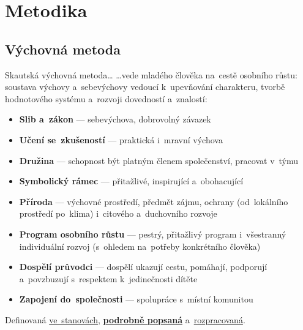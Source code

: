 \documentclass[compress, xelatex, 11pt, xcolor=dvipsnames, print, aspectratio=169,
	hyperref={
		bookmarks=true,
		unicode=true,
		colorlinks=true,
		pdftitle={Skautska vychovna metoda},
		plainpages=false,
		pdfauthor={Vojtech Zeisek},
		pdfsubject={Skautska vychovna metoda a jeji vyvoj za posledni stoleti a desetileti},
		pdfcreator={XeLaTeX},
		pdfkeywords={Junak, Pedagogika, Skaut, Skauting, Vychovna metoda},
		linkcolor=Red, %
		anchorcolor=ForestGreen, %
		citecolor=ForestGreen, %
		filecolor=ForestGreen, %
		menucolor=ForestGreen, %
		urlcolor=Sepia, %
		pdftex},
	url={hyphens, lowtilde} %
	]{beamer}
\begin{document}
\section{Metodika}

\subsection{Výchovná metoda}

\begin{frame}{Skautská výchovná metoda\ldots}
	\ldots vede mladého člověka na~cestě osobního růstu: soustava výchovy a~sebevýchovy vedoucí k~upevňování charakteru, tvorbě hodnotového systému a~rozvoji dovedností a~znalostí:
	\begin{itemize}
		\item \textbf{Slib a~zákon} --- sebevýchova, dobrovolný závazek
		\item \textbf{Učení se~zkušeností} --- praktická i~mravní výchova
		\item \textbf{Družina} --- schopnost být platným členem společenství, pracovat v~týmu
		\item \textbf{Symbolický rámec} --- přitažlivé, inspirující a~obohacující
		\item \textbf{Příroda} --- výchovné prostředí, předmět zájmu, ochrany (od~lokálního prostředí po~klima) i~citového a~duchovního rozvoje
		\item \textbf{Program osobního růstu} --- pestrý, přitažlivý program i~všestranný individuální rozvoj (s~ohledem na~potřeby konkrétního člověka)
		\item \textbf{Dospělí průvodci} --- dospělí ukazují cestu, pomáhají, podporují a~povzbuzují s~respektem k~jedinečnosti dítěte
		\item \textbf{Zapojení do~společnosti} --- spolupráce s~místní komunitou
	\end{itemize}
	Definovaná \href{https://krizovatka.skaut.cz/spisovna/stanovy-junaka-ceskeho-skauta}{ve~stanovách}, \href{https://krizovatka.skaut.cz/vedu-oddil/skautska-vychova/skautska-vychovna-metoda}{\textbf{podrobně popsaná}} a~\href{https://krizovatka.skaut.cz/vedu-oddil/skautska-vychova}{rozpracovaná}.
\end{frame}
\end{document}
